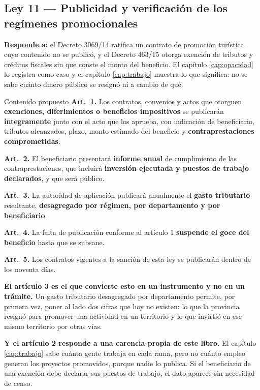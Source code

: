 \subsection{Ley 11 --- Publicidad y verificación de los regímenes promocionales}

\textbf{Responde a:} el Decreto 3069/14 ratifica un contrato de promoción turística cuyo
contenido no se publicó, y el Decreto 463/15 otorga exención de tributos y créditos fiscales
sin que conste el monto del beneficio. El capítulo \ref{cap:opacidad} lo
registra como caso y el capítulo \ref{cap:trabajo} muestra lo que significa: no se sabe cuánto
dinero público se resignó ni a cambio de qué.

\begin{ficha}{Contenido propuesto}
\textbf{Art.\ 1.} Los contratos, convenios y actos que otorguen \textbf{exenciones,
diferimientos o beneficios impositivos} se publicarán \textbf{íntegramente} junto con el acto
que los aprueba, con indicación de beneficiario, tributos alcanzados, plazo, monto estimado
del beneficio y \textbf{contraprestaciones comprometidas}.

\textbf{Art.\ 2.} El beneficiario presentará \textbf{informe anual} de cumplimiento de las
contraprestaciones, que incluirá \textbf{inversión ejecutada y puestos de trabajo declarados},
y que será público.

\textbf{Art.\ 3.} La autoridad de aplicación publicará anualmente el \textbf{gasto tributario}
resultante, \textbf{desagregado por régimen, por departamento y por beneficiario}.

\textbf{Art.\ 4.} La falta de publicación conforme al artículo 1 \textbf{suspende el goce del
beneficio} hasta que se subsane.

\textbf{Art.\ 5.} Los contratos vigentes a la sanción de esta ley se publicarán dentro de los
noventa días.
\end{ficha}

\textbf{El artículo 3 es el que convierte esto en un instrumento y no en un trámite.} Un
gasto tributario desagregado por departamento permite, por primera vez, poner al lado dos
cifras que hoy no existen: lo que la provincia resignó para promover una actividad en un
territorio y lo que invirtió en ese mismo territorio por otras vías.

\textbf{Y el artículo 2 responde a una carencia propia de este libro.} El capítulo
\ref{cap:trabajo} sabe cuánta gente trabaja en cada rama, pero no cuánto empleo generan los proyectos promovidos, porque
nadie lo publica. Si el beneficiario de una exención debe declarar sus puestos de trabajo, el
dato aparece sin necesidad de censo.

